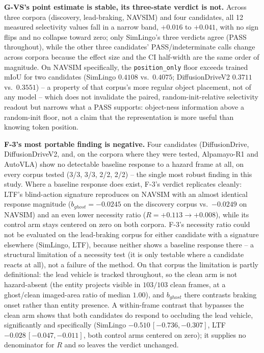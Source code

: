 \textbf{G-VS's point estimate is stable, its three-state verdict is not.} Across three
corpora (discovery, lead-braking, NAVSIM) and four candidates, all 12 measured
selectivity values fall in a narrow band, $+0.016$ to $+0.041$, with no sign flips and no
collapse toward zero; only SimLingo's three verdicts agree (PASS throughout), while the
other three candidates' PASS/indeterminate calls change across corpora because the effect
size and the CI half-width are the same order of magnitude. On NAVSIM specifically, the
\texttt{position\_only} floor exceeds trained mIoU for two candidates (SimLingo $0.4108$
vs.\ $0.4075$; DiffusionDriveV2 $0.3711$ vs.\ $0.3551$) -- a property of that corpus's more
regular object placement, not of any model -- which does not invalidate the paired,
random-init-relative selectivity readout but narrows what a PASS supports: object-ness
information above a random-init floor, not a claim that the representation is more useful
than knowing token position.

\textbf{F-3's most portable finding is negative.} Four candidates (DiffusionDrive,
DiffusionDriveV2, and, on the corpora where they were tested, Alpamayo-R1 and AutoVLA)
show no detectable baseline response to a hazard frame at all, on every corpus tested
(3/3, 3/3, 2/2, 2/2) -- the single most robust finding in this study. Where a baseline
response does exist, F-3's verdict replicates cleanly: LTF's blind-action signature
reproduces on NAVSIM with an almost identical response magnitude ($b_{ghost}=-0.0245$ on
the discovery corpus vs.\ $-0.0249$ on NAVSIM) and an even lower necessity ratio
($R=+0.113\to+0.008$), while its control arm stays centered on zero on both corpora. F-3's
necessity ratio could not be evaluated on the lead-braking corpus for either candidate
with a signature elsewhere (SimLingo, LTF), because neither shows a baseline response
there -- a structural limitation of a necessity test (it is only testable where a
candidate reacts at all), not a failure of the method. On that corpus the limitation is
partly definitional: the lead vehicle is tracked throughout, so the clean arm is not
hazard-absent (the entity projects visible in $103/103$ clean frames, at a ghost/clean
imaged-area ratio of median $1.00$), and $b_{ghost}$ there contrasts braking onset rather
than entity presence. A within-frame contrast that bypasses the clean arm shows that both
candidates do respond to occluding the lead vehicle, significantly and specifically
(SimLingo $-0.510\,[-0.736,-0.307]$, LTF $-0.028\,[-0.047,-0.011]$, both control arms
centered on zero); it supplies no denominator for $R$ and so leaves the verdict unchanged.

